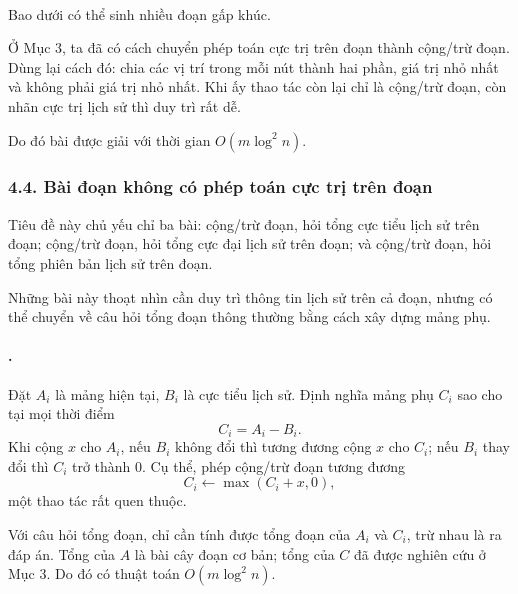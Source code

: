 \documentclass[11pt]{article}
\begin{document}
\begin{center}
\\[-0.2em]
{\small Bao dưới có thể sinh nhiều đoạn gấp khúc.}
\end{center}

Ở Mục 3, ta đã có cách chuyển phép toán cực trị trên đoạn thành cộng/trừ
đoạn. Dùng lại cách đó: chia các vị trí trong mỗi nút thành hai phần, giá trị
nhỏ nhất và không phải giá trị nhỏ nhất. Khi ấy thao tác còn lại chỉ là
cộng/trừ đoạn, còn nhãn cực trị lịch sử thì duy trì rất dễ.

Do đó bài được giải với thời gian \(O(m\log^2 n)\).

\subsubsection*{4.4. Bài đoạn không có phép toán cực trị trên đoạn}

Tiêu đề này chủ yếu chỉ ba bài: cộng/trừ đoạn, hỏi tổng cực tiểu lịch sử trên
đoạn; cộng/trừ đoạn, hỏi tổng cực đại lịch sử trên đoạn; và cộng/trừ đoạn,
hỏi tổng phiên bản lịch sử trên đoạn.

Những bài này thoạt nhìn cần duy trì thông tin lịch sử trên cả đoạn, nhưng có
thể chuyển về câu hỏi tổng đoạn thông thường bằng cách xây dựng mảng phụ.

\paragraph{.}
Đặt \(A_i\) là mảng hiện tại, \(B_i\) là cực tiểu lịch sử. Định nghĩa mảng
phụ \(C_i\) sao cho tại mọi thời điểm
\[
  C_i=A_i-B_i.
\]
Khi cộng \(x\) cho \(A_i\), nếu \(B_i\) không đổi thì tương đương cộng \(x\)
cho \(C_i\); nếu \(B_i\) thay đổi thì \(C_i\) trở thành \(0\). Cụ thể, phép
cộng/trừ đoạn tương đương
\[
  C_i\leftarrow \max(C_i+x,0),
\]
một thao tác rất quen thuộc.

Với câu hỏi tổng đoạn, chỉ cần tính được tổng đoạn của \(A_i\) và \(C_i\),
trừ nhau là ra đáp án. Tổng của \(A\) là bài cây đoạn cơ bản; tổng của \(C\)
đã được nghiên cứu ở Mục 3. Do đó có thuật toán \(O(m\log^2 n)\).
\end{document}
